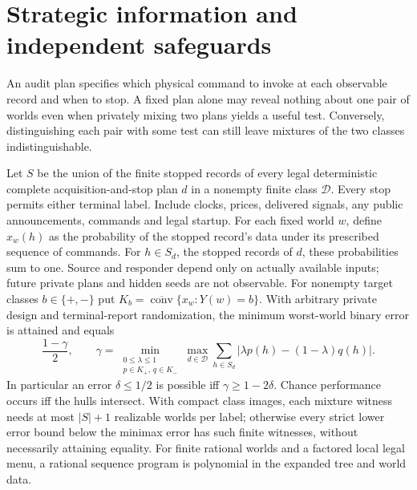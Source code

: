 \section{Strategic information and independent safeguards}\label{app:strategy}
An audit plan specifies which physical command to invoke at each observable record and when to stop. A fixed plan alone may reveal nothing about one pair of worlds even when privately mixing two plans yields a useful test. Conversely, distinguishing each pair with some test can still leave mixtures of the two classes indistinguishable.

\begin{theorem}\label{adv:ag1}
Let \(S\) be the union of the finite stopped records of every legal deterministic complete acquisition-and-stop plan \(d\) in a nonempty finite class \(\mathcal D\). Every stop permits either terminal label. Include clocks, prices, delivered signals, any public announcements, commands and legal startup. For each fixed world \(w\), define \(x_w(h)\) as the probability of the stopped record's data under its prescribed sequence of commands. For \(h\in S_d\), the stopped records of \(d\), these probabilities sum to one. Source and responder depend only on actually available inputs; future private plans and hidden seeds are not observable. For nonempty target classes \(b\in\{+,-\}\) put \(K_b=\overline{\operatorname{conv}}\{x_w:Y(w)=b\}\).
With arbitrary private design and terminal-report randomization, the minimum worst-world binary error is attained and equals
\[
 \frac{1-\gamma}{2},\qquad
 \gamma=\min_{\substack{0\le\lambda\le1\\p\in K_+,\,q\in K_-}}
       \max_{d\in\mathcal D}\sum_{h\in S_d}
                   |\lambda p(h)-(1-\lambda)q(h)|.
\]
In particular an error \(\delta\le1/2\) is possible iff \(\gamma\ge1-2\delta\). Chance performance occurs iff the hulls intersect. With compact class images, each mixture witness needs at most \(|S|+1\) realizable worlds per label; otherwise every strict lower error bound below the minimax error has such finite witnesses, without necessarily attaining equality. For finite rational worlds and a factored local legal menu, a rational sequence program is polynomial in the expanded tree and world data.
\end{theorem}
